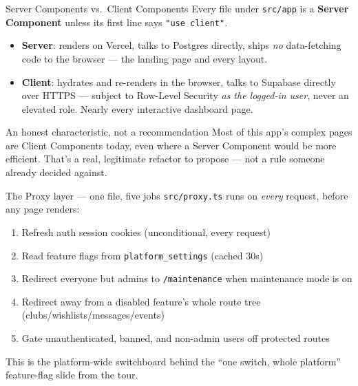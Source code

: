 \documentclass[aspectratio=169,11pt]{beamer}
\newcommand{\code}[1]{\textcolor{olkTealDark}{\texttt{#1}}}
\begin{document}
\begin{frame}{Server Components vs.\ Client Components}
  Every file under \code{src/app} is a \textbf{Server Component} unless its first line says \code{"use client"}.
  \begin{itemize}
    \item \textbf{Server}: renders on Vercel, talks to Postgres directly, ships \emph{no} data-fetching code to the browser --- the landing page and every layout.
    \item \textbf{Client}: hydrates and re-renders in the browser, talks to Supabase directly over HTTPS --- subject to Row-Level Security \emph{as the logged-in user}, never an elevated role. Nearly every interactive dashboard page.
  \end{itemize}
  \vfill
  \begin{alertblock}{An honest characteristic, not a recommendation}
    Most of this app's complex pages are Client Components today, even where a Server Component would be more efficient. That's a real, legitimate refactor to propose --- not a rule someone already decided against.
  \end{alertblock}
\end{frame}

\begin{frame}[fragile]{The Proxy layer --- one file, five jobs}
  \code{src/proxy.ts} runs on \emph{every} request, before any page renders:
  \begin{enumerate}
    \item Refresh auth session cookies (unconditional, every request)
    \item Read feature flags from \code{platform\_settings} (cached 30s)
    \item Redirect everyone but admins to \code{/maintenance} when maintenance mode is on
    \item Redirect away from a disabled feature's whole route tree (clubs/wishlists/messages/events)
    \item Gate unauthenticated, banned, and non-admin users off protected routes
  \end{enumerate}
  \vfill
  \small This is the platform-wide switchboard behind the ``one switch, whole platform'' feature-flag slide from the tour.
\end{frame}
\end{document}

